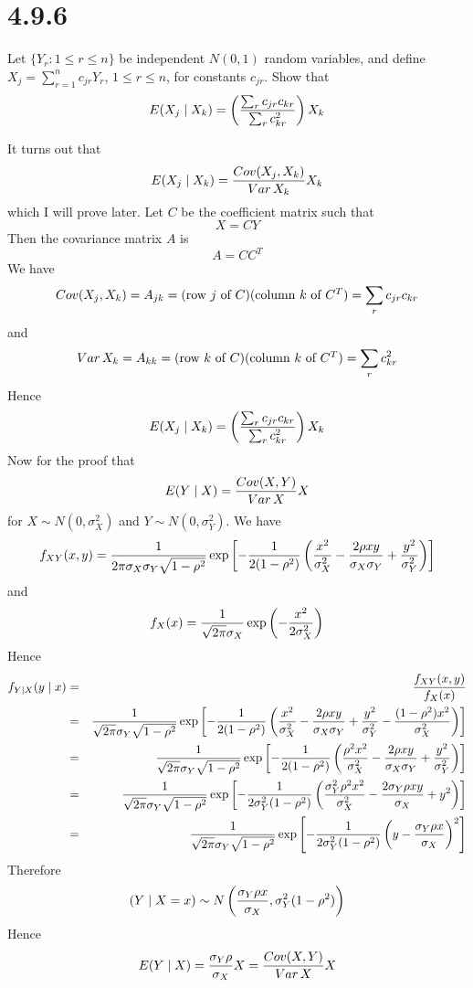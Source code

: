 \section*{4.9.6}
Let $\{Y_r:1\le r\le n\}$ be independent $N(0,1)$ random variables,
and define $X_j=\sum_{r=1}^n c_{jr}Y_r$,
$1\le r\le n$, for constants $c_{jr}$. Show that
$$E(X_j\mid X_k)=\left(\sum_r c_{jr}c_{kr}\over\sum_r c_{kr}^2\right)
X_k$$

\bigskip
\noindent
It turns out that
$$E(X_j\mid X_k)={\mathop{Cov}(X_j,X_k)\over\mathop{Var}X_k}X_k$$
which I will prove later.
Let $C$ be the coefficient matrix such that
$$X=CY$$
Then the covariance matrix $A$ is
$$A=CC^T$$
We have
$$\mathop{Cov}(X_j,X_k)=A_{jk}=
(\hbox{row $j$ of $C$})
(\hbox{column $k$ of $C^T$})
=\sum_r c_{jr}c_{kr}$$
and
$$\mathop{Var}X_k=A_{kk}=
(\hbox{row $k$ of $C$})
(\hbox{column $k$ of $C^T$})
=\sum_r c_{kr}^2$$
Hence
$$E(X_j\mid X_k)=\left(\sum_r c_{jr}c_{kr}\over\sum_r c_{kr}^2\right)
X_k$$
%
Now for the proof that
$$E(Y\mid X)={\mathop{Cov}(X,Y)\over\mathop{Var}X}X$$
for $X\sim N(0,\sigma_X^2)$ and $Y\sim N(0,\sigma_Y^2)$.
We have
$$f_{XY}(x,y)={1\over2\pi\sigma_X\sigma_Y\sqrt{1-\rho^2}}
\exp\left[
-{1\over2(1-\rho^2)}
\left(
{x^2\over\sigma_X^2}
-{2\rho xy\over\sigma_X\sigma_Y}
+{y^2\over\sigma_Y^2}
\right)\right]
$$
and
$$f_{X}(x)={1\over\sqrt{2\pi}\sigma_X}
\exp\left(-{x^2\over2\sigma_X^2}\right)$$
Hence
\begin{eqnarray*}
f_{Y\mid X}(y\mid x)
&=&{f_{XY}(x,y)\over f_X(x)}\\
&=&{1\over\sqrt{2\pi}\sigma_Y\sqrt{1-\rho^2}}
\exp\left[-{1\over2(1-\rho^2)}\left(
{x^2\over\sigma_X^2}
-{2\rho xy\over\sigma_X\sigma_Y}
+{y^2\over\sigma_Y^2}
-{(1-\rho^2)x^2\over\sigma_X^2}
\right)\right]\\
%
&=&{1\over\sqrt{2\pi}\sigma_Y\sqrt{1-\rho^2}}
\exp\left[-{1\over2(1-\rho^2)}\left(
{\rho^2x^2\over\sigma_X^2}
-{2\rho xy\over\sigma_X\sigma_Y}
+{y^2\over\sigma_Y^2}
\right)\right]\\
%
&=&{1\over\sqrt{2\pi}\sigma_Y\sqrt{1-\rho^2}}
\exp\left[-{1\over2\sigma_Y^2(1-\rho^2)}\left(
{\sigma_Y^2\rho^2x^2\over\sigma_X^2}
-{2\sigma_Y\rho xy\over\sigma_X}
+y^2
\right)\right]\\
%
&=&{1\over\sqrt{2\pi}\sigma_Y\sqrt{1-\rho^2}}
\exp\left[-{1\over2\sigma_Y^2(1-\rho^2)}\left(
y-{\sigma_Y\rho x\over\sigma_X}\right)^2\right]
\end{eqnarray*}
Therefore
$$(Y\mid X=x)\sim N\left(
{\sigma_Y\rho x\over\sigma_X},\sigma_Y^2(1-\rho^2)\right)$$
Hence
$$E(Y\mid X)={\sigma_Y\rho\over\sigma_X}X
={\mathop{Cov}(X,Y)\over\mathop{Var}X}X$$
